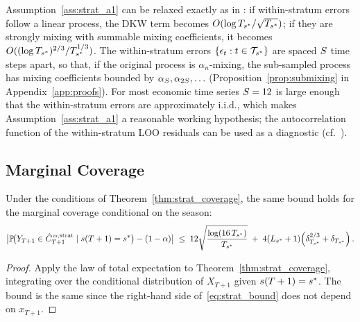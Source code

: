\begin{remark}
\label{rem:mixing}
Assumption~\ref{ass:strat_a1} can be relaxed exactly as in
\citet[Corollaries~1--2]{xu2023conformal}: if within-stratum errors
follow a linear process, the DKW term becomes
$O(\log T_{s^*} / \sqrt{T_{s^*}})$; if they are strongly mixing with
summable mixing coefficients, it becomes
$O((\log T_{s^*})^{2/3} / T_{s^*}^{1/3})$.
The within-stratum errors $\{\epsilon_t : t \in \mathcal{T}_{s^*}\}$
are spaced $S$ time steps apart, so that, if the original
process is $\alpha_n$-mixing, the sub-sampled process has mixing
coefficients bounded by $\alpha_{S}, \alpha_{2S}, \ldots$
(Proposition~\ref{prop:submixing} in Appendix~\ref{app:proofs}).
For most economic time series $S = 12$ is large enough that the
within-stratum errors are approximately i.i.d., which makes
Assumption~\ref{ass:strat_a1} a reasonable working hypothesis; the
autocorrelation function of the within-stratum LOO residuals can be
used as a diagnostic (cf.\ \citealt{xu2023conformal}).
\end{remark}

\subsection{Marginal Coverage}
\label{sec:theory:marginal}

\begin{corollary}
\label{cor:marginal}
Under the conditions of Theorem~\ref{thm:strat_coverage},
the same bound holds for the marginal coverage conditional
on the season:
\begin{equation}
  \label{eq:marginal_strat}
  \bigl|
    \mathbb{P}\!\bigl(
      Y_{T+1} \in \hat{C}_{T+1}^{\,\alpha,\textup{strat}}
      \mid s(T+1) = s^*
    \bigr) - (1-\alpha)
  \bigr|
  \;\leq\;
  12\sqrt{\frac{\log(16\,T_{s^*})}{T_{s^*}}}
  \;+\;
  4(L_{s^*}+1)\!\left(\delta_{T_{s^*}}^{2/3} + \delta_{T_{s^*}}\right).
\end{equation}
\end{corollary}

\begin{proof}
Apply the law of total expectation to
Theorem~\ref{thm:strat_coverage}, integrating over the conditional
distribution of $X_{T+1}$ given $s(T+1) = s^*$.  The bound
is the same since the right-hand side of~\eqref{eq:strat_bound}
does not depend on $x_{T+1}$.
\end{proof}

